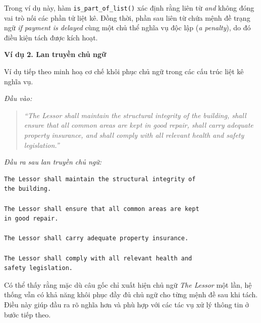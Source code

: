 Trong ví dụ này, hàm \texttt{is\_part\_of\_list()} xác định rằng liên từ
\textit{and} không đóng vai trò nối các phần tử liệt kê. Đồng thời, phần
sau liên từ chứa mệnh đề trạng ngữ \textit{if payment is delayed} cùng
một chủ thể nghĩa vụ độc lập (\textit{a penalty}), do đó điều kiện tách
được kích hoạt.

\vspace{0.5em}

\textbf{Ví dụ 2. Lan truyền chủ ngữ}

Ví dụ tiếp theo minh hoạ cơ chế khôi phục chủ ngữ trong các cấu trúc
liệt kê nghĩa vụ.

\hspace*{0.5cm}\textit{Đầu vào:}

\begin{quote}
    \textit{``The Lessor shall maintain the structural integrity of the
    building, shall ensure that all common areas are kept in good
    repair, shall carry adequate property insurance, and shall comply
    with all relevant health and safety legislation.''}
\end{quote}

\hspace*{0.5cm}\textit{Đầu ra sau lan truyền chủ ngữ:}

\begin{verbatim}
The Lessor shall maintain the structural integrity of
the building.

The Lessor shall ensure that all common areas are kept
in good repair.

The Lessor shall carry adequate property insurance.

The Lessor shall comply with all relevant health and
safety legislation.
\end{verbatim}

Có thể thấy rằng mặc dù câu gốc chỉ xuất hiện chủ ngữ \textit{The Lessor}
một lần, hệ thống vẫn có khả năng khôi phục đầy đủ chủ ngữ cho từng mệnh
đề sau khi tách. Điều này giúp đầu ra rõ nghĩa hơn và phù hợp với các tác
vụ xử lý thông tin ở bước tiếp theo.


